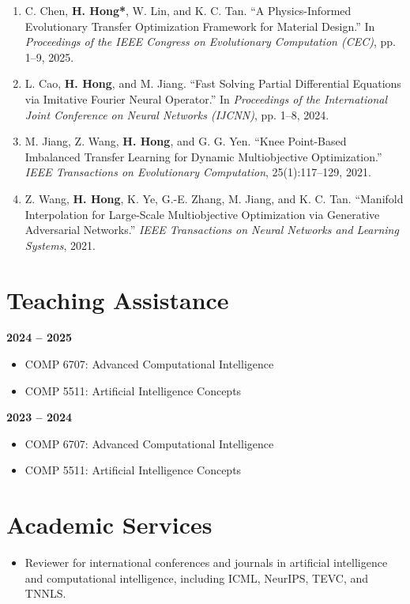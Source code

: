 \documentclass[11pt,a4paper]{article}
\begin{document}
\begin{enumerate}[leftmargin=1.5em]

\item C. Chen, \textbf{H. Hong*}, W. Lin, and K. C. Tan.
\newblock ``A Physics-Informed Evolutionary Transfer Optimization Framework for Material Design.''
\newblock In \textit{Proceedings of the IEEE Congress on Evolutionary Computation (CEC)}, pp. 1--9, 2025.

\item L. Cao, \textbf{H. Hong}, and M. Jiang.
\newblock ``Fast Solving Partial Differential Equations via Imitative Fourier Neural Operator.''
\newblock In \textit{Proceedings of the International Joint Conference on Neural Networks (IJCNN)}, pp. 1--8, 2024.

\item M. Jiang, Z. Wang, \textbf{H. Hong}, and G. G. Yen.
\newblock ``Knee Point-Based Imbalanced Transfer Learning for Dynamic Multiobjective Optimization.''
\newblock \textit{IEEE Transactions on Evolutionary Computation}, 25(1):117--129, 2021.

\item Z. Wang, \textbf{H. Hong}, K. Ye, G.-E. Zhang, M. Jiang, and K. C. Tan.
\newblock ``Manifold Interpolation for Large-Scale Multiobjective Optimization via Generative Adversarial Networks.''
\newblock \textit{IEEE Transactions on Neural Networks and Learning Systems}, 2021.

\end{enumerate}

\section*{Teaching Assistance}

\textbf{2024 -- 2025}
\begin{itemize}
    \item COMP 6707: Advanced Computational Intelligence
    \item COMP 5511: Artificial Intelligence Concepts
\end{itemize}

\noindent\textbf{2023 -- 2024}
\begin{itemize}
    \item COMP 6707: Advanced Computational Intelligence
    \item COMP 5511: Artificial Intelligence Concepts
\end{itemize}

\section*{Academic Services}

\begin{itemize}
    \item Reviewer for international conferences and journals in artificial intelligence and computational intelligence, including ICML, NeurIPS, TEVC, and TNNLS.
\end{itemize}
\end{document}

